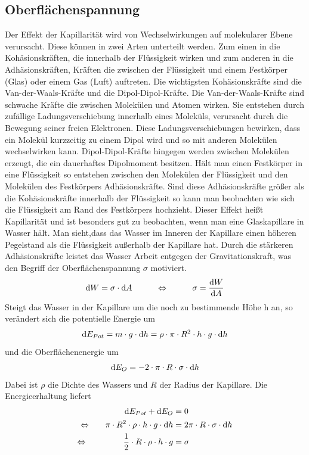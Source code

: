 \documentclass[12pt, a4paper, twoside]{scrartcl}
\begin{document}
\subsection{Oberflächenspannung}
Der Effekt der Kapillarität wird von Wechselwirkungen auf molekularer Ebene verursacht. Diese können in zwei Arten unterteilt werden. Zum einen in die Kohäsionskräften, die innerhalb der Flüssigkeit wirken und zum anderen in die Adhäsionskräften, Kräften die zwischen der Flüssigkeit und einem Festkörper (Glas) oder einem Gas (Luft) auftreten.\newline
\newline
Die wichtigsten Kohäsionskräfte sind die Van-der-Waals-Kräfte und die Dipol-Dipol-Kräfte. Die Van-der-Waals-Kräfte sind schwache Kräfte die zwischen Molekülen und Atomen wirken. Sie entstehen durch zufällige Ladungsverschiebung innerhalb eines Moleküls, verursacht durch die Bewegung seiner freien Elektronen. Diese Ladungsverschiebungen bewirken, dass ein Molekül kurzzeitig zu einem Dipol wird und so mit anderen Molekülen wechselwirken kann. 
Dipol-Dipol-Kräfte hingegen werden zwischen Molekülen erzeugt, die ein dauerhaftes Dipolmoment besitzen.\newline
\newline
Hält man einen Festkörper in eine Flüssigkeit so entstehen zwischen den Molekülen der Flüssigkeit und den Molekülen des Festkörpers Adhäsionskräfte. Sind diese Adhäsionskräfte größer als die Kohäsionskräfte innerhalb der Flüssigkeit so kann man beobachten wie sich die Flüssigkeit am Rand des Festkörpers hochzieht. Dieser Effekt heißt Kapillarität und ist besonders gut zu beobachten, wenn man eine Glaskapillare in Wasser hält. Man sieht,dass das Wasser im Inneren der Kapillare einen höheren Pegelstand als die Flüssigkeit außerhalb der Kapillare hat. Durch die stärkeren Adhäsionskräfte leistet das Wasser Arbeit entgegen der Gravitationskraft, was den Begriff der Oberflächenspannung $\sigma$ motiviert. \[\textup dW=\sigma\cdot\textup dA\hspace{1cm}\Leftrightarrow\hspace{1cm}\sigma=\frac{\textup dW}{\textup dA}\] Steigt das Wasser in der Kapillare um die noch zu bestimmende Höhe h an, so verändert sich die potentielle Energie um \[\textup dE_{Pot}=m\cdot g\cdot\textup dh=\rho\cdot\pi\cdot R^2\cdot h\cdot g\cdot\textup dh\] und die Oberflächenenergie um \[\textup dE_{O}=-2\cdot\pi\cdot R\cdot\sigma\cdot\textup dh\]Dabei ist $\rho$ die Dichte des Wassers und $R$ der Radius der Kapillare. Die Energieerhaltung liefert 
\begin{align}
\textup dE_{Pot}+\textup dE_{O}&=0 \nonumber\\
\Leftrightarrow\hspace{0.6cm}\pi\cdot R^2\cdot\rho\cdot h \cdot g\cdot\textup dh&=2\pi\cdot R\cdot\sigma\cdot\textup dh \nonumber\\
\Leftrightarrow\hspace{1.5cm} \frac{1}{2}\cdot R\cdot\rho\cdot h\cdot g&=\sigma \label{eq:oberflaechenspannung}
\end{align}\newline
\end{document}
